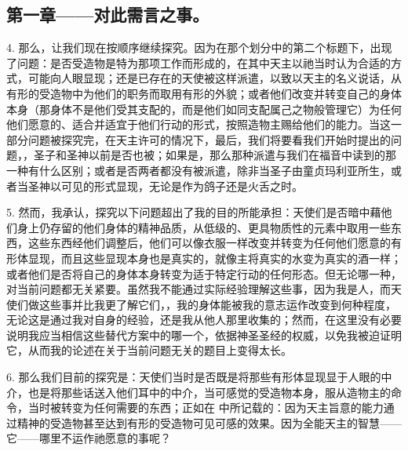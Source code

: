 \subsection{第一章——对此需言之事。}

4. 那么，让我们现在按顺序继续探究。因为在那个划分中的第二个标题下，出现了问题：是否受造物是特为那项工作而形成的，在其中天主以祂当时认为合适的方式，可能向人眼显现；还是已存在的天使被这样派遣，以致以天主的名义说话，从有形的受造物中为他们的职务而取用有形的外貌；或者他们改变并转变自己的身体本身（那身体不是他们受其支配的，而是他们如同支配属己之物般管理它）为任何他们愿意的、适合并适宜于他们行动的形式，按照造物主赐给他们的能力。当这一部分问题被探究完，在天主许可的情况下，最后，我们将要看我们开始时提出的问题，，圣子和圣神以前是否也被；如果是，那么那种派遣与我们在福音中读到的那一种有什么区别；或者是否两者都没有被派遣，除非当圣子由童贞玛利亚所生，或者当圣神以可见的形式显现，无论是作为鸽子还是火舌之时。\par

5. 然而，我承认，探究以下问题超出了我的目的所能承担：天使们是否暗中藉他们身上仍存留的他们身体的精神品质，从低级的、更具物质性的元素中取用一些东西，这些东西经他们调整后，他们可以像衣服一样改变并转变为任何他们愿意的有形体显现，而且这些显现本身也是真实的，就像主将真实的水变为真实的酒一样；或者他们是否将自己的身体本身转变为适于特定行动的任何形态。但无论哪一种，对当前问题都无关紧要。虽然我不能通过实际经验理解这些事，因为我是人，而天使们做这些事并比我更了解它们，，我的身体能被我的意志运作改变到何种程度，无论这是通过我对自身的经验，还是我从他人那里收集的；然而，在这里没有必要说明我应当相信这些替代方案中的哪一个，依据神圣圣经的权威，以免我被迫证明它，从而我的论述在关于当前问题无关的题目上变得太长。\par

6. 那么我们目前的探究是：天使们当时是否既是将那些有形体显现显于人眼的中介，也是将那些话送入他们耳中的中介，当可感觉的受造物本身，服从造物主的命令，当时被转变为任何需要的东西；正如在  中所记载的：因为天主旨意的能力通过精神的受造物甚至达到有形的受造物可见可感的效果。因为全能天主的智慧——它——哪里不运作祂愿意的事呢？\par


